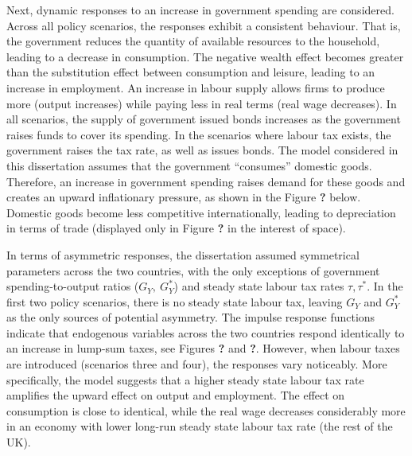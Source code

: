 Next, dynamic responses to an increase in government spending are considered. Across all policy scenarios, the responses exhibit a consistent behaviour. That is, the government reduces the quantity of available resources to the household, leading to a decrease in consumption. The negative wealth effect becomes greater than the substitution effect between consumption and leisure, leading to an increase in employment. An increase in labour supply allows firms to produce more (output increases) while paying less in real terms (real wage decreases). In all scenarios, the supply of government issued bonds increases as the government raises funds to cover its spending. In the scenarios where labour tax exists, the government raises the tax rate, as well as issues bonds. The model considered in this dissertation assumes that the government ``consumes'' domestic goods. Therefore, an increase in government spending raises demand for these goods and creates an upward inflationary pressure, as shown in the Figure \textbf{?} below. Domestic goods become less competitive internationally, leading to depreciation in terms of trade (displayed only in Figure \textbf{?} in the interest of space). 

In terms of asymmetric responses, the dissertation assumed symmetrical parameters across the two countries, with the only exceptions of government spending-to-output ratios ($G_Y, \ G_Y^*$) and steady state labour tax rates $\tau, \tau^*$. In the first two policy scenarios, there is no steady state labour tax, leaving $G_Y$ and $G_Y^*$ as the only sources of potential asymmetry. The impulse response functions indicate that endogenous variables across the two countries respond identically to an increase in lump-sum taxes, see Figures \textbf{?} and \textbf{?}. However, when labour taxes are introduced (scenarios three and four), the responses vary noticeably. More specifically, the model suggests that a higher steady state labour tax rate amplifies the upward effect on output and employment. The effect on consumption is close to identical, while the real wage decreases considerably more in an economy with lower long-run steady state labour tax rate (the rest of the UK). 

